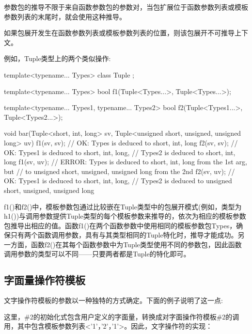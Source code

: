 参数包的推导不限于来自函数参数包的参数对，当包扩展位于函数参数列表或模板参数列表的末尾时，就会使用这种推导。

\begin{notice}
如果包展开发生在函数参数列表或模板参数列表的位置，则该包展开不可推导上下文。
\end{notice}

例如，Tuple类型上的两个类似操作:

\begin{cpp}
template<typename... Types> class Tuple { };

template<typename... Types>
bool f1(Tuple<Types...>, Tuple<Types...>);

template<typename... Types1, typename... Types2>
bool f2(Tuple<Types1...>, Tuple<Types2...>);

void bar(Tuple<short, int, long> sv,
		Tuple<unsigned short, unsigned, unsigned long> uv)
{
	f1(sv, sv); // OK: Types is deduced to {short, int, long}
	f2(sv, sv); // OK: Types1 is deduced to {short, int, long},
				// Types2 is deduced to {short, int, long}
	f1(sv, uv); // ERROR: Types is deduced to {short, int, long} from the 1st arg, but
				// to {unsigned short, unsigned, unsigned long} from the 2nd
	f2(sv, uv); // OK: Types1 is deduced to {short, int, long},
				// Types2 is deduced to {unsigned short, unsigned, unsigned long}
}
\end{cpp}

f1()和f2()中，模板参数包通过比较嵌在Tuple类型中的包展开模式(例如，类型为h1())与调用参数提供Tuple类型的每个模板参数来推导的，依次为相应的模板参数包推导出相应的值。函数f1()在两个函数参数中使用相同的模板参数包Types，确保只有两个函数调用参数，具有与其类型相同的Tuple特化时，推导才能成功。另一方面，函数f2()在其每个函数参数中为Tuple类型使用不同的参数包，因此函数调用参数的类型可以不同——只要两者都是Tuple的特化即可。

\subsection{字面量操作符模板}

文字操作符模板的参数以一种独特的方式确定。下面的例子说明了这一点:


这里，\#2的初始化式包含用户定义的字面量，转换成对字面操作符模板\#2的调用，其中包含模板参数列表<'1'，'2'，'1'>。因此，文字操作符的实现：

